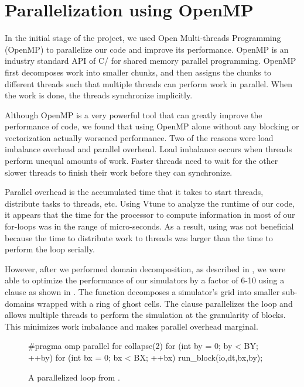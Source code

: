 \section{Parallelization using OpenMP}\label{sec:parallelization}

In the initial stage of the project, we used Open Multi-threads Programming
(OpenMP) to parallelize our code and improve its performance. OpenMP is an
industry standard API of C/\cplusplus{} for shared memory parallel programming.
OpenMP first decomposes work into smaller chunks, and then assigns the chunks
to different threads such that multiple threads can perform work in parallel.
When the work is done, the threads synchronize implicitly.

Although OpenMP is a very powerful tool that can greatly improve the
performance of code, we found that using OpenMP alone without any blocking or
vectorization actually worsened performance. Two of the reasons were load
imbalance overhead and parallel overhead. Load imbalance occurs when threads
perform unequal amounts of work. Faster threads need to wait for the other
slower threads to finish their work before they can synchronize.

Parallel overhead is the accumulated time that it takes to start threads,
distribute tasks to threads, etc. Using Vtune to analyze the runtime of our
code, it appears that the time for the processor to compute information in most
of our for-loops was in the range of micro-seconds. As a result, using
 was not beneficial because the time to
distribute work to threads was larger than the time to perform the loop
serially.

However, after we performed domain decomposition, as described in
, we were able to optimize the performance of our
simulators by a factor of 6-10 using a  clause as shown in . The  function
decomposes a simulator's grid into smaller sub-domains wrapped with a ring of
ghost cells. The  clause
parallelizes the loop and allows multiple threads to perform the simulation at
the granularity of blocks. This minimizes work imbalance and makes parallel
overhead marginal.

\begin{figure}[h]
\centering
\begin{CPP}[firstnumber=476]
#pragma omp parallel for collapse(2)
for (int by = 0; by < BY; ++by) {
    for (int bx = 0; bx < BX; ++bx) {
        run_block(io,dt,bx,by);
    }
}
\end{CPP}
\caption{A parallelized loop from .}
\label{fig:omp}
\end{figure}
